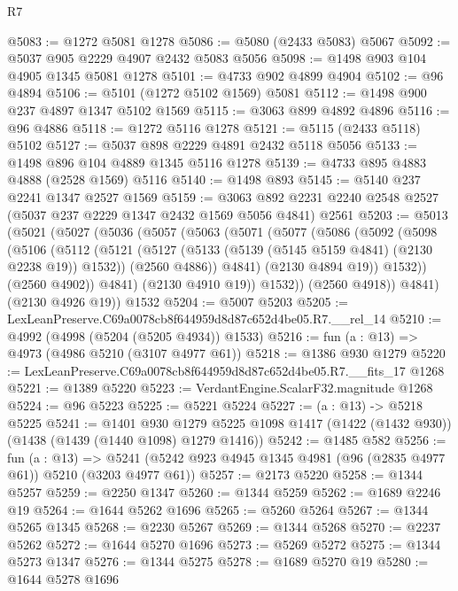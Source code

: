 \begin{lexlean}{R7}
\begin{coremodule}
@5083 := @1272 @5081 @1278
@5086 := @5080 (@2433 @5083) @5067
@5092 := @5037 @905 @2229 @4907 @2432 @5083 @5056
@5098 := @1498 @903 @104 @4905 @1345 @5081 @1278
@5101 := @4733 @902 @4899 @4904
@5102 := @96 @4894
@5106 := @5101 (@1272 @5102 @1569) @5081
@5112 := @1498 @900 @237 @4897 @1347 @5102 @1569
@5115 := @3063 @899 @4892 @4896
@5116 := @96 @4886
@5118 := @1272 @5116 @1278
@5121 := @5115 (@2433 @5118) @5102
@5127 := @5037 @898 @2229 @4891 @2432 @5118 @5056
@5133 := @1498 @896 @104 @4889 @1345 @5116 @1278
@5139 := @4733 @895 @4883 @4888 (@2528 @1569) @5116
@5140 := @1498 @893
@5145 := @5140 @237 @2241 @1347 @2527 @1569
@5159 := @3063 @892 @2231 @2240 @2548 @2527 (@5037 @237 @2229 @1347 @2432 @1569 @5056 @4841) @2561
@5203 := @5013
    (@5021
      (@5027
        (@5036
          (@5057
            (@5063
              (@5071
                (@5077
                  (@5086
                    (@5092
                      (@5098
                        (@5106
                          (@5112
                            (@5121
                              (@5127 (@5133 (@5139 (@5145 @5159 @4841) (@2130 @2238 @19)) @1532))
                              (@2560 @4886))
                            @4841)
                          (@2130 @4894 @19))
                        @1532))
                    (@2560 @4902))
                  @4841)
                (@2130 @4910 @19))
              @1532))
          (@2560 @4918))
        @4841)
      (@2130 @4926 @19))
    @1532
@5204 := @5007 @5203
@5205 := LexLeanPreserve.C69a0078cb8f644959d8d87c652d4be05.R7.__rel_14
@5210 := @4992 (@4998 (@5204 (@5205 @4934)) @1533)
@5216 := fun (a : @13) => @4973 (@4986 @5210 (@3107 @4977 @61))
@5218 := @1386 @930 @1279
@5220 := LexLeanPreserve.C69a0078cb8f644959d8d87c652d4be05.R7.__fits_17 @1268
@5221 := @1389 @5220
@5223 := VerdantEngine.ScalarF32.magnitude @1268
@5224 := @96 @5223
@5225 := @5221 @5224
@5227 := (a : @13) -> @5218 @5225
@5241 := @1401
    @930
    @1279
    @5225
    @1098
    @1417
    (@1422 (@1432 @930))
    (@1438 (@1439 (@1440 @1098) @1279 @1416))
@5242 := @1485 @582
@5256 := fun (a : @13) =>
  @5241 (@5242 @923 @4945 @1345 @4981 (@96 (@2835 @4977 @61)) @5210 (@3203 @4977 @61))
@5257 := @2173 @5220
@5258 := @1344 @5257
@5259 := @2250 @1347
@5260 := @1344 @5259
@5262 := @1689 @2246 @19
@5264 := @1644 @5262 @1696
@5265 := @5260 @5264
@5267 := @1344 @5265 @1345
@5268 := @2230 @5267
@5269 := @1344 @5268
@5270 := @2237 @5262
@5272 := @1644 @5270 @1696
@5273 := @5269 @5272
@5275 := @1344 @5273 @1347
@5276 := @1344 @5275
@5278 := @1689 @5270 @19
@5280 := @1644 @5278 @1696

\end{coremodule}
\end{lexlean}
